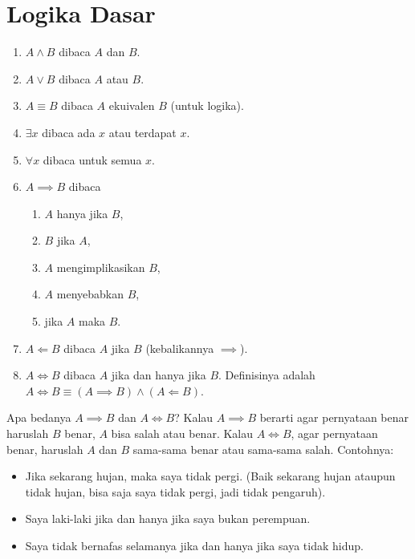 \section{Logika Dasar}
\begin{enumerate}
    \item $A \land B$ dibaca $A$ dan $B$.
    \item $A \lor B$ dibaca $A$ atau $B$.
    \item $A \equiv B$ dibaca $A$ ekuivalen $B$ (untuk logika).
    \item $\exists x$ dibaca ada $x$ atau terdapat $x$.
    \item $\forall x$ dibaca untuk semua $x$.
    \item $A \implies B$ dibaca
    \begin{enumerate}
        \item $A$ hanya jika $B$,
        \item $B$ jika $A$,
        \item $A$ mengimplikasikan $B$,
        \item $A$ menyebabkan $B$,
        \item jika $A$ maka $B$.
    \end{enumerate}
    \item $A \Longleftarrow B$ dibaca $A$ jika $B$ (kebalikannya $\implies$).
    \item $A \iff B$ dibaca $A$ jika dan hanya jika $B$. Definisinya adalah $A \iff B \equiv (A \implies B) \land (A \Longleftarrow B)$.
\end{enumerate}
Apa bedanya $A \implies B$ dan $A \iff B$? Kalau $A \implies B$ berarti agar pernyataan benar haruslah $B$ benar, $A$ bisa salah atau benar. Kalau $A \iff B$, agar pernyataan benar, haruslah $A$ dan $B$ sama-sama benar atau sama-sama salah. Contohnya:
\begin{itemize}
    \item Jika sekarang hujan, maka saya tidak pergi. (Baik sekarang hujan ataupun tidak hujan, bisa saja saya tidak pergi, jadi tidak pengaruh).
    \item Saya laki-laki jika dan hanya jika saya bukan perempuan.
        \item Saya tidak bernafas selamanya jika dan hanya jika saya tidak hidup.
\end{itemize}